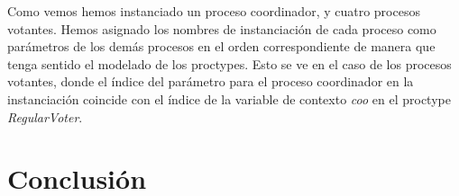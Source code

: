 \documentclass[titlepage, 12pt]{book}
\begin{document}
Como vemos hemos instanciado un proceso coordinador, y cuatro procesos votantes. Hemos asignado los nombres de instanciación de cada proceso como parámetros de los demás procesos en el orden correspondiente de manera que tenga sentido el modelado de los proctypes. Esto se ve en el caso de los procesos votantes, donde el índice del parámetro para el proceso coordinador en la instanciación coincide con el índice de la variable de contexto \textit{coo} en el proctype \textit{RegularVoter}.\\








\chapter{Conclusi\'on}



\appendix
\appendixpage
\noappendicestocpagenum
\addappheadtotoc
\end{document}
